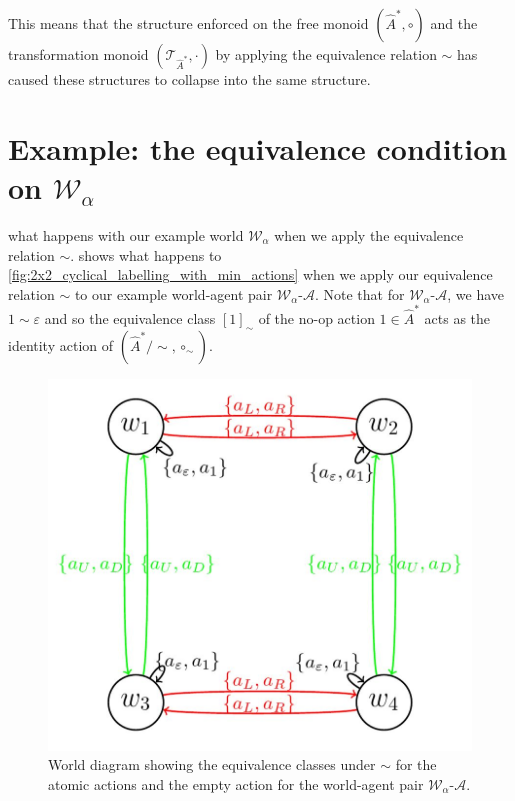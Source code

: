 This means that the structure enforced on the free monoid $(\hat{A}^{*}, \circ)$ and the transformation monoid $(\mathcal{T}_{\hat{A}^{*}}, \cdot)$ by applying the equivalence relation $\sim$ has caused these structures to collapse into the same structure.

\section{
Example: the equivalence condition on \texorpdfstring{$\mathscr{W}_{\alpha}$}{the toy world}
 }\label{sec:the_equivalence_condition_on_example_world}

 what happens with our example world $\mathscr{W}_{\alpha}$ when we apply the equivalence relation $\sim$.  shows what happens to \cref{fig:2x2_cyclical_labelling_with_min_actions} when we apply our equivalence relation $\sim$ to our example world-agent pair $\mathscr{W}_{\alpha}$-$\mathscr{A}$.
Note that for $\mathscr{W}_{\alpha}$-$\mathscr{A}$, we have $1 \sim \varepsilon$ and so the equivalence class $[1]_{\sim}$ of the no-op action $1 \in \hat{A}^{*}$ acts as the identity action of $(\hat{A}^{*}/\sim, \circ_{\sim})$.

\begin{figure}[H]
    \centering
    \includegraphics[width=0.75\linewidth]{2MathematicalFramework/Images/2x2_cyclical_equivalence_min_actions.jpeg}
    \caption{
    World diagram showing the equivalence classes under $\sim$ for the atomic actions and the empty action for the world-agent pair $\mathscr{W}_{\alpha}$-$\mathscr{A}$.
    }
    \label{fig:2x2_cyclical_equivalence_min_actions}
\end{figure}


